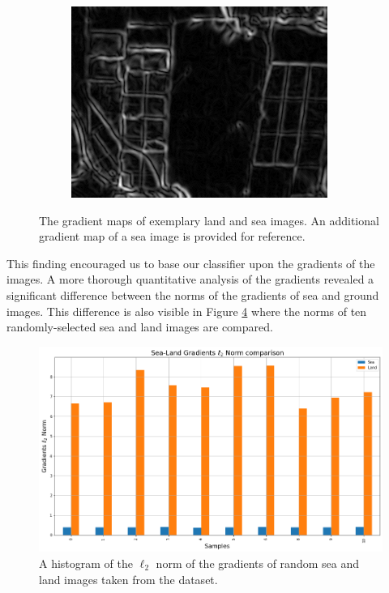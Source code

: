 \documentclass[10pt,twocolumn,letterpaper]{article}
\begin{document}
\begin{figure}[ht]
\begin{subfigure}[b]{0.15\textwidth}
        \label{fig:sea_grad}
    \end{subfigure}
    \hfill
    \begin{subfigure}[b]{0.15\textwidth}
        \centering
        \includegraphics[width=\textwidth]{../figs/data/land_grad.png}
        \label{fig:land_grad}
    \end{subfigure}
    \caption{The gradient maps of exemplary land and sea images. An additional gradient map of a sea image is provided for reference.}
    \label{fig:grad_img_comp}
\end{figure}
This finding encouraged us to base our classifier upon the gradients of the images.
A more thorough quantitative analysis of the gradients revealed a significant difference between the norms of the gradients of sea and ground images.
This difference is also visible in Figure \ref{fig:gradients_norm} where the norms of ten randomly-selected sea and land images are compared.
\begin{figure}[ht]
    \centering
    \includegraphics[width=\linewidth]{../figs/data/grad_norm_comp.png}
    \caption{A histogram of the $\ell_2$ norm of the gradients of random sea and land images taken from the dataset.}
    \label{fig:gradients_norm}
\end{figure}
\end{document}
